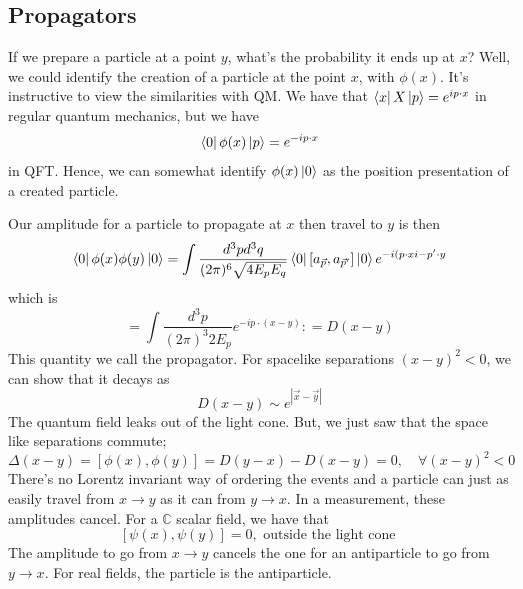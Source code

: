\documentclass[11pt, oneside]{article}   	%
\theoremstyle{newline}
\theoremstyle{newline}
\theoremstyle{newline}
\theoremstyle{newline}
\theoremstyle{newline}
\begin{document}
\subsection{Propagators} 

If we prepare a particle at a point $ y $, what's the probability it 
ends up at $ x $? Well, we could identify the creation 
of a particle at the point $ x $, with  $ \phi ( x) $. It's instructive to view the similarities with QM. 
We have that  $ \bra { x } X \ket { p }  = e^{i p \cdot  x} $ in regular quantum mechanics, but we have
\[
\bra{ 0 } \phi ( x) \ket { p }  = e^{  - i p \cdot  x }
\] in QFT. Hence, we can somewhat identify $ \phi ( x) \ket{ 0 } $ as the position  presentation of a created particle. 

Our amplitude for a particle to propagate at $x $ then travel to $ y $ is then  
\[
\bra{0}\phi ( x) \phi( y ) \ket{0}  = \int \frac{d^ 3 p d^ 3 q }{ ( 2 \pi )^6 \sqrt{ 4 E_p E_q } } \bra{0}[ a_{\vec{p}}, a_{\vec{p}'}]\ket{0} e^{  - i (  p \cdot  x   i -  p' \cdot  y }
\] which is 
\[
= \int \frac{d^3 p }{ ( 2 \pi )^ 3 2E_p } e^{  - i p \cdot  ( x - y ) } : = D ( x - y ) 
\] This quantity we call the propagator. 
For spacelike separations $ ( x - y )^2 < 0 $, we can show that it decays as 
\[
D( x -y ) \sim e^{ | \vec{x} - \vec{y} |  } 
\] The quantum field leaks out of the light cone. 
But, we just saw that the space like separations commute; 
\[
\Delta ( x -y ) = [ \phi( x ), \phi ( y) ] = D( y - x ) - D ( x- y )  =0 ,\quad \forall ( x - y )^2 < 0 
\] There's no Lorentz invariant way of ordering the events and a particle can just as 
easily travel from $ x \to  y $ as it can from $ y \to x $. 
In a measurement, these amplitudes cancel. 
For a $ \mathbb{ C} $ scalar field, we have that 
\[
[ \psi ( x), \psi ( y ) ] = 0, \text{ outside the light cone } 
\] 
The amplitude to go from $ x \to  y $ cancels the one 
for an antiparticle to go from 
$ y \to   x$. For real fields, the particle is the antiparticle. 
\end{document}
